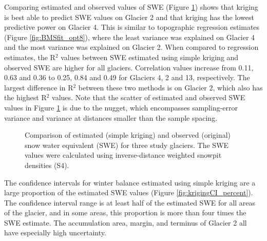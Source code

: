 \documentclass{sfuthesis}
\begin{document}
Comparing estimated and observed values of SWE (Figure \ref{fig:R2simplekrig}) shows that kriging is best able to predict SWE values on Glacier 2 and that kriging has the lowest predictive power on Glacier 4. This is similar to topographic regression estimates (Figure \ref{fig:BMSfit_opt8}), where the least variance was explained on Glacier 4 and the most variance was explained on Glacier 2. When compared to regression estimates, the R$^2$ values between SWE estimated using simple kriging and observed SWE are higher for all glaciers. Correlation values increase from 0.11, 0.63 and 0.36 to 0.25, 0.84 and 0.49 for Glaciers 4, 2 and 13, respectively. The largest difference in R$^2$ between these two methods is on Glacier 2, which also has the highest R$^2$ values. Note that the scatter of estimated and observed SWE values in Figure \ref{fig:R2simplekrig} is due to the nugget, which encompasses sampling-error variance and variance at distances smaller than the sample spacing.

\begin{figure}
	\caption{Comparison of estimated (simple kriging) and observed (original) snow water equivalent (SWE) for three study glaciers. The SWE values were calculated using inverse-distance weighted snowpit densities (S4).}
	\label{fig:R2simplekrig}
\end{figure}

The confidence intervals for winter balance estimated using simple kriging are a large proportion of the estimated SWE values (Figure \ref{fig:krigingCI_percent}). The confidence interval range is at least half of the estimated SWE for all areas of the glacier, and in some areas, this proportion is more than four times the SWE estimate. The accumulation area, margin, and terminus of Glacier 2 all have especially high uncertainty. 
\end{document}

